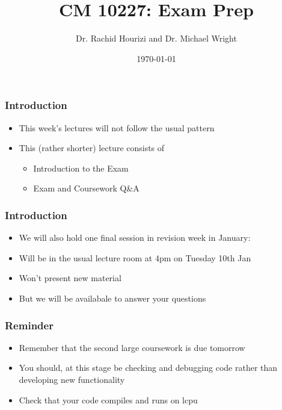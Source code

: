 \documentclass{beamer}
\begin{document}

\title{CM 10227: Exam Prep}
\author{Dr. Rachid Hourizi and Dr. Michael Wright}
\date{\today}
\frame{\titlepage}

\begin{frame}
\frametitle{Introduction}
\begin{itemize}
\item This week’s lectures will not follow the usual pattern
\item This (rather shorter) lecture consists of
\begin{itemize}
\item Introduction to the Exam
\item Exam and Coursework Q\&A
\end{itemize}
\end{itemize}
\end{frame}

\begin{frame}
\frametitle{Introduction}
\begin{itemize}
\item We will also hold one final session in revision week in January:
\item Will be in the usual lecture room at 4pm on Tuesday 10th Jan
\item Won't present new material
\item But we will be availabale to answer your questions
\end{itemize}
\end{frame}

\begin{frame}
\frametitle{Reminder}
\begin{itemize}
\item Remember that the second large coursework is due tomorrow
\item You should, at this stage be checking and debugging code rather than developing new functionality
\item Check that your code compiles and runs on lcpu 
\end{itemize}
\end{frame}
\end{document}
